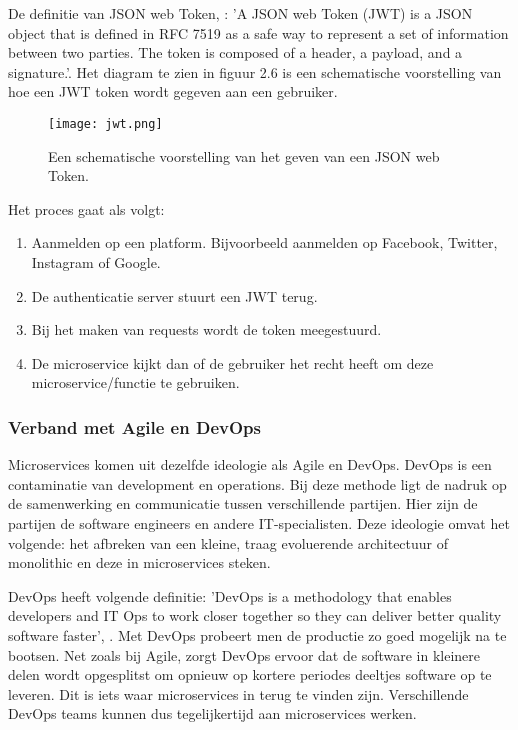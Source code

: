 De definitie van JSON  web Token, \textcite{Stecky-Efantis2016}: 'A JSON  web Token (JWT) is a JSON object that is defined in RFC 7519 as a safe way to represent a set of information between two parties. The token is composed of a header, a payload, and a signature.'. Het diagram te zien in figuur 2.6 is een schematische voorstelling van hoe een JWT token wordt gegeven aan een gebruiker.
\begin{figure}[h!]
	\texttt{[image: jwt.png]}
	\centering
	\caption{Een schematische voorstelling van het geven van een JSON  web Token. \textcite{Stecky-Efantis2016}}
\end{figure}
Het proces gaat als volgt:
\begin{enumerate}
	\item Aanmelden op een platform. Bijvoorbeeld aanmelden op Facebook, Twitter, Instagram of Google.
	\item De authenticatie server stuurt een JWT terug.
	\item Bij het maken van requests wordt de token meegestuurd.
	\item De microservice kijkt dan of de gebruiker het recht heeft om deze microservice/functie te gebruiken.
\end{enumerate}


\subsubsection{Verband met Agile en DevOps}
Microservices komen uit dezelfde ideologie als Agile en DevOps. DevOps is een contaminatie  van development en operations. Bij deze methode ligt de nadruk op de samenwerking en communicatie tussen verschillende partijen. Hier zijn de partijen de software engineers en andere IT-specialisten. Deze ideologie omvat het volgende: het afbreken van een kleine, traag evoluerende architectuur of monolithic en deze in microservices steken.

DevOps heeft volgende definitie: 'DevOps is a methodology that enables developers and IT Ops to work closer together so they can deliver better quality software faster', \textcite{Morgan2019}. Met DevOps probeert men de productie zo goed mogelijk na te bootsen. Net zoals bij Agile, zorgt DevOps ervoor dat de software in kleinere delen wordt opgesplitst om opnieuw op kortere periodes deeltjes software op te leveren. Dit is iets waar microservices in terug te vinden zijn. Verschillende DevOps teams kunnen dus tegelijkertijd aan microservices  werken.

